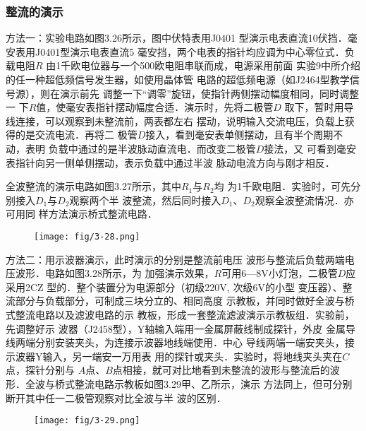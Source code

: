 \subsubsection{整流的演示}
方法一：实验电路如图3.26所示，图中伏特表用J0401
型演示电表直流10伏挡．毫安表用J0401型演示电表直流5
毫安挡，两个电表的指针均应调为中心零位式．负载电阻$R$
由1千欧电位器与一个500欧电阻串联而成，电源采用前面
实验9中所介绍的任一种超低频信号发生器，如使用晶体管
电路的超低频电源（如J2464型教学信号源），则在演示前先
调整一下“调零”旋钮，使指针两侧摆动幅度相同，同时调整一
下$R$值，使毫安表指针摆动幅度合适．演示时，先将二极管$D$
取下，暂时用导线连接，可以观察到未整流前，两表都左右
摆动，说明输入交流电压，负载上获得的是交流电流．再将二
极管$D$接入，看到毫安表单侧摆动，且有半个周期不动，表明
负载中通过的是半波脉动直流电．而改变二极管$D$接法，又
可看到毫安表指针向另一侧单侧摆动，表示负载中通过半波
脉动电流方向与刚才相反．

全波整流的演示电路如图3.27所示，其中$R_1$与$R_2$均
为1千欧电阻．实验时，可先分别接入$D_1$与$D_2$观察两个半
波整流，然后同时接入$D_1$、$D_2$观察全波整流情况．亦可用同
样方法演示桥式整流电路．

\begin{figure}[htp]
    \centering
\texttt{[image: fig/3-28.png]}
    \caption{}
\end{figure}

方法二：用示波器演示，此时演示的分别是整流前电压
波形与整流后负载两端电压波形．电路如图3.28所示，为
加强演示效果，$R$可用6—8V小灯泡，二极管$D$应采用2CZ
型的．整个装置分为电源部分（初级220V, 次级6V的小型
变压器）、整流部分与负载部分，可制成三块分立的、相同高度
示教板，并同时做好全波与桥式整流电路以及滤波电路的示
教板，形成一套整流滤波演示示教板组．实验前，先调整好示
波器（J2458型），Y轴输入端用一金属屏蔽线制成探针，外皮
金属导线两端分别安装夹头，为连接示波器地线端使用．中心
导线两端一端安夹头，接示波器Y输入，另一端安一万用表
用的探针或夹头．实验时，将地线夹头夹在$C$点，探针分别与
$A$点、$B$点相接，就可对比地看到未整流的波形与整流后的波
形．全波与桥式整流电路示教板如图3.29甲、乙所示，演示
方法同上，但可分别断开其中任一二极管观察对比全波与半
波的区别．

\begin{figure}[htp]
    \centering
\texttt{[image: fig/3-29.png]}
    \caption{}
\end{figure}

